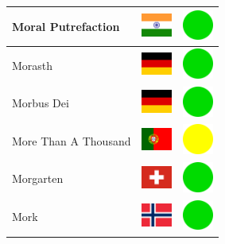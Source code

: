 \documentclass[12pt, a4paper, twoside]{report}
\begin{document}
\begin{center}
\begin{longtable}{|p{5cm}|p{2cm}|p{2cm}|}
 Moral Putrefaction                                         & \includegraphics[width=1cm]{../4x3/in} &   \includegraphics[width=1cm]{../likes/y} \\ \hline
 Morasth                                                    & \includegraphics[width=1cm]{../4x3/de} &   \includegraphics[width=1cm]{../likes/y} \\ \hline
 Morbus Dei                                                 & \includegraphics[width=1cm]{../4x3/de} &   \includegraphics[width=1cm]{../likes/y} \\ \hline
 More Than A Thousand                                       & \includegraphics[width=1cm]{../4x3/pt} &   \includegraphics[width=1cm]{../likes/m} \\ \hline
 Morgarten                                                  & \includegraphics[width=1cm]{../4x3/ch} &   \includegraphics[width=1cm]{../likes/y} \\ \hline
 Mork                                                       & \includegraphics[width=1cm]{../4x3/no} &   \includegraphics[width=1cm]{../likes/y} \\ \hline

\end{longtable}
\end{center}
\end{document}
